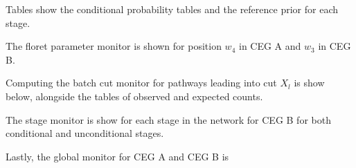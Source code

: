 \documentclass[12pt]{article}
\begin{document}
Tables show the conditional probability tables and the reference prior for each stage.

The floret parameter monitor is shown for position $w_4$ in CEG A and $w_3$ in CEG B.

Computing the batch cut monitor for pathways leading into cut $X_l$ is show below, alongside the tables of observed and expected counts.

The stage monitor is show for each stage in the network for CEG B for both conditional and unconditional stages. 

Lastly, the global monitor for CEG A and CEG B is 
 
%
%
%	
%	

%
%
%
% 
%    
%


\end{document}
